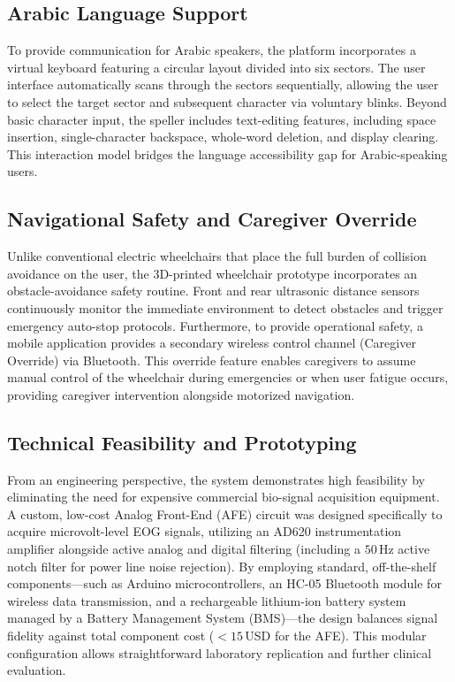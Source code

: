 \subsection{Arabic Language Support}
\label{subsec:arabic_language_support}

To provide communication for Arabic speakers, the platform incorporates a virtual keyboard featuring a circular layout divided into six sectors. The user interface automatically scans through the sectors sequentially, allowing the user to select the target sector and subsequent character via voluntary blinks. Beyond basic character input, the speller includes text-editing features, including space insertion, single-character backspace, whole-word deletion, and display clearing. This interaction model bridges the language accessibility gap for Arabic-speaking users.

\subsection{Navigational Safety and Caregiver Override}
\label{subsec:navigational_safety}

Unlike conventional electric wheelchairs that place the full burden of collision avoidance on the user, the 3D-printed wheelchair prototype incorporates an obstacle-avoidance safety routine. Front and rear ultrasonic distance sensors continuously monitor the immediate environment to detect obstacles and trigger emergency auto-stop protocols. Furthermore, to provide operational safety, a mobile application provides a secondary wireless control channel (Caregiver Override) via Bluetooth. This override feature enables caregivers to assume manual control of the wheelchair during emergencies or when user fatigue occurs, providing caregiver intervention alongside motorized navigation.

\subsection{Technical Feasibility and Prototyping}
\label{subsec:technical_clinical_feasibility}

From an engineering perspective, the system demonstrates high feasibility by eliminating the need for expensive commercial bio-signal acquisition equipment. A custom, low-cost Analog Front-End (AFE) circuit was designed specifically to acquire microvolt-level EOG signals, utilizing an AD620 instrumentation amplifier alongside active analog and digital filtering (including a $50\,\text{Hz}$ active notch filter for power line noise rejection). By employing standard, off-the-shelf components---such as Arduino microcontrollers, an HC-05 Bluetooth module for wireless data transmission, and a rechargeable lithium-ion battery system managed by a Battery Management System (BMS)---the design balances signal fidelity against total component cost ($<15$\,USD for the AFE). This modular configuration allows straightforward laboratory replication and further clinical evaluation.
